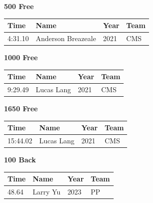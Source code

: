 \noindent\begin{minipage}[t]{0.98\textwidth}
\centering
\textbf{\textcolor{teamprimary}{500 Free}}\par
\vspace{0.5em}
\centering
\small
\renewcommand{\arraystretch}{1.0}
\setlength{\tabcolsep}{4pt}
\begin{tabular}{@{}p{2.5cm}p{4.5cm}p{1.5cm}p{2.5cm}@{}}
\toprule
\textbf{Time} & \textbf{Name} & \textbf{Year} & \textbf{Team} \\
\midrule
4:31.10 & Anderson Breazeale & 2021 & CMS \\
\bottomrule
\end{tabular}
\end{minipage}
\vspace{1.2em}
\noindent\begin{minipage}[t]{0.98\textwidth}
\centering
\textbf{\textcolor{teamprimary}{1000 Free}}\par
\vspace{0.5em}
\centering
\small
\renewcommand{\arraystretch}{1.0}
\setlength{\tabcolsep}{4pt}
\begin{tabular}{@{}p{2.5cm}p{4.5cm}p{1.5cm}p{2.5cm}@{}}
\toprule
\textbf{Time} & \textbf{Name} & \textbf{Year} & \textbf{Team} \\
\midrule
9:29.49 & Lucas Lang & 2021 & CMS \\
\bottomrule
\end{tabular}
\end{minipage}
\vspace{1.2em}
\noindent\begin{minipage}[t]{0.98\textwidth}
\centering
\textbf{\textcolor{teamprimary}{1650 Free}}\par
\vspace{0.5em}
\centering
\small
\renewcommand{\arraystretch}{1.0}
\setlength{\tabcolsep}{4pt}
\begin{tabular}{@{}p{2.5cm}p{4.5cm}p{1.5cm}p{2.5cm}@{}}
\toprule
\textbf{Time} & \textbf{Name} & \textbf{Year} & \textbf{Team} \\
\midrule
15:44.02 & Lucas Lang & 2021 & CMS \\
\bottomrule
\end{tabular}
\end{minipage}
\vspace{1.2em}
\noindent\begin{minipage}[t]{0.98\textwidth}
\centering
\textbf{\textcolor{teamprimary}{100 Back}}\par
\vspace{0.5em}
\centering
\small
\renewcommand{\arraystretch}{1.0}
\setlength{\tabcolsep}{4pt}
\begin{tabular}{@{}p{2.5cm}p{4.5cm}p{1.5cm}p{2.5cm}@{}}
\toprule
\textbf{Time} & \textbf{Name} & \textbf{Year} & \textbf{Team} \\
\midrule
48.64 & Larry Yu & 2023 & PP \\
\bottomrule
\end{tabular}
\end{minipage}
